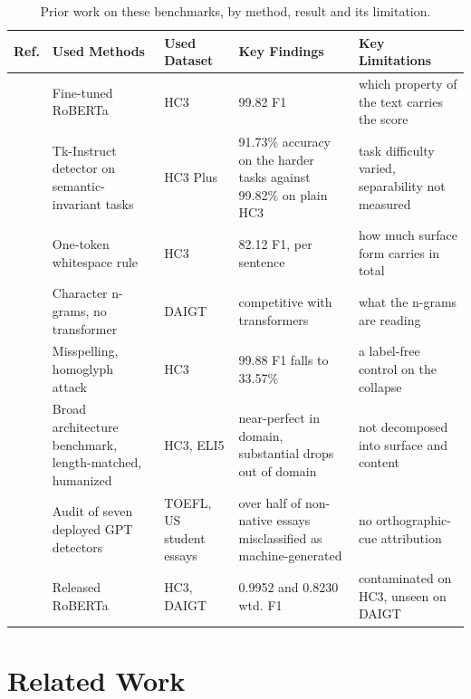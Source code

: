 \documentclass[conference,a4paper]{IEEEtran}
\begin{document}
\begin{table}[!t]
\centering
\caption{Prior work on these benchmarks, by method, result and its limitation. %
}
\label{tab:relatedwork}
\scriptsize
\setlength{\tabcolsep}{4pt}
\begin{tabularx}{\textwidth}{@{}lp{3.4cm}p{1.9cm}XX@{}}
\toprule
\textbf{Ref}. & \textbf{Used Methods} & \textbf{Used Dataset} & \textbf{Key Findings} & \textbf{Key Limitations} \\
\midrule
\cite{Guo2023close} & Fine-tuned RoBERTa & HC3 & 99.82 F1 & which property of the text carries the score \\
\cite{Su2023plus} & Tk-Instruct detector on semantic-invariant tasks & HC3 Plus & 91.73\% accuracy on the harder tasks against 99.82\% on plain HC3 & task difficulty varied, separability not measured \\
\cite{Tian2023multiscale} & One-token whitespace rule & HC3 & 82.12 F1, per sentence & how much surface form carries in total \\
\cite{Zhou2024exploiting} & Character n-grams, no transformer & DAIGT & competitive with transformers & what the n-grams are reading \\
\cite{Antoun2023towards} & Misspelling, homoglyph attack & HC3 & 99.88 F1 falls to 33.57\% & a label-free control on the collapse \\
\cite{Baidya2026detecting} & Broad architecture benchmark, length-matched, humanized & HC3, ELI5 & near-perfect in domain, substantial drops out of domain & not decomposed into surface and content \\
\cite{Liang2023gpt} & Audit of seven deployed GPT detectors & TOEFL, US student essays & over half of non-native essays misclassified as machine-generated & no orthographic-cue attribution \\
\cite{HelloSimpleAI2023detector} & Released RoBERTa & HC3, DAIGT & 0.9952 and 0.8230 wtd. F1 & contaminated on HC3, unseen on DAIGT \\
\bottomrule
\end{tabularx}
\end{table}

\section{Related Work}
\label{sec:related}
\end{document}
